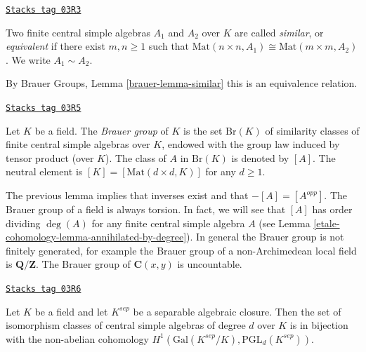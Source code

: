 \begin{definition}
\label{etale-cohomology-definition-brauer-equivalent}
\href{https://stacks.math.columbia.edu/tag/03R3}{\texttt{Stacks tag 03R3}}

Two finite central simple algebras $A_1$ and $A_2$ over $K$ are called
{\it similar}, or {\it equivalent} if there exist $m, n \geq 1$
such that $\text{Mat}(n \times n, A_1)
\cong \text{Mat}(m \times m, A_2)$. We write $A_1 \sim A_2$.
\end{definition}

By Brauer Groups, Lemma \ref{brauer-lemma-similar} this is an
equivalence relation.

\begin{definition}
\label{etale-cohomology-definition-brauer-group}
\href{https://stacks.math.columbia.edu/tag/03R5}{\texttt{Stacks tag 03R5}}

Let $K$ be a field. The {\it Brauer group} of $K$ is the set $\text{Br} (K)$
of similarity classes of finite central simple algebras over $K$, endowed with
the group law induced by tensor product (over $K$). The class of $A$ in
$\text{Br}(K)$ is denoted by $[A]$. The neutral element is
$[K] = [\text{Mat}(d \times d, K)]$ for any $d \geq 1$.
\end{definition}

The previous lemma implies that inverses exist and that $-[A] = [A^{opp}]$.
The Brauer group of a field is always torsion.
In fact, we will see that $[A]$ has order dividing $\deg(A)$
for any finite central simple algebra $A$ (see
Lemma \ref{etale-cohomology-lemma-annihilated-by-degree}).
In general the Brauer group is not finitely generated, for example
the Brauer group of a non-Archimedean local field is $\mathbf{Q}/\mathbf{Z}$.
The Brauer group of $\mathbf{C}(x, y)$ is uncountable.

\begin{lemma}
\label{etale-cohomology-lemma-central-simple-algebra-pgln}
\href{https://stacks.math.columbia.edu/tag/03R6}{\texttt{Stacks tag 03R6}}


Let $K$ be a field and let $K^{sep}$ be a separable algebraic closure.
Then the set of isomorphism classes of central simple algebras of degree
$d$ over $K$ is in bijection with the non-abelian cohomology
$H^1(\text{Gal}(K^{sep}/K), \text{PGL}_d(K^{sep}))$.
\end{lemma}

